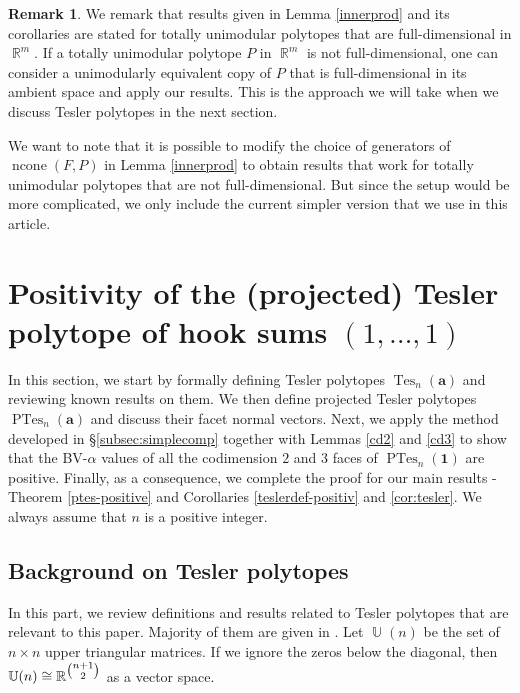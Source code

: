 \documentclass[12pt]{amsart}
\numberwithin{equation}{section}
\theoremstyle{definition}
\newtheorem{rmk}[thm]{Remark}
\def\tes{\operatorname{Tes}}
\def\ptes{\operatorname{PTes}}
\def\ncone{\operatorname{ncone}}
\def\ba{{\boldsymbol{a}}}
\def\U{\operatorname{\mathbb{U}}}
\def\R{\operatorname{\mathbb{R}}}
\begin{document}
\begin{rmk}\label{rmk:fulldim}
  We remark that results given in Lemma \ref{innerprod} and its corollaries are stated for totally unimodular polytopes that are full-dimensional in $\R^m$. If a totally unimodular polytope $P$ in $\R^m$ is not full-dimensional, one can consider a unimodularly equivalent copy of $P$ that is full-dimensional in its ambient space and apply our results. This is the approach we will take when we discuss Tesler polytopes in the next section.

  We want to note that it is possible to modify the choice of generators of $\ncone(F,P)$ in Lemma \ref{innerprod} to obtain results that work for totally unimodular polytopes that are not full-dimensional. But since the setup would be more complicated, we only include the current simpler version that we use in this article.  
\end{rmk}



\section{Positivity of the (projected) Tesler polytope of hook sums $(1,\dots,1)$} \label{sec:positivity}

In this section, we start by formally defining Tesler polytopes $\tes_n(\ba)$ and reviewing known results on them. We then define projected Tesler polytopes $\ptes_n(\ba)$ and discuss their facet normal vectors. Next, we apply the method developed in \S \ref{subsec:simplecomp} together with Lemmas \ref{cd2} and \ref{cd3} to show that the BV-$\alpha$ values of all the codimension $2$ and $3$ faces of $\ptes_{n}(\boldsymbol{1})$ are positive. Finally, as a consequence, we complete the proof for our main results - Theorem \ref{ptes-positive} and Corollaries \ref{teslerdef-positiv} and \ref{cor:tesler}. We always assume that $n$ is a positive integer. 


\subsection{Background on Tesler polytopes}

In this part, we review definitions and results related to Tesler polytopes that are relevant to this paper. Majority of them are given in \cite{Meszaros2017}.  Let $\U(n)$ be the set of $n \times n$ upper triangular matrices. If we ignore the zeros below the diagonal, then $\U(n) \cong \R^{\tbinom{n+1}{2}}$ as a vector space. 
\end{document}
